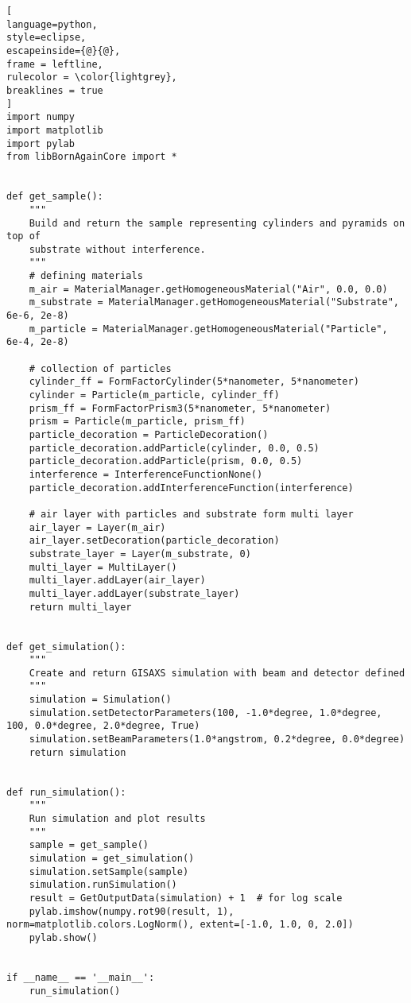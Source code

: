 \begin{lstlisting}[
language=python, 
style=eclipse, 
escapeinside={@}{@},
frame = leftline, 
rulecolor = \color{lightgrey},
breaklines = true
]
import numpy
import matplotlib
import pylab
from libBornAgainCore import *


def get_sample():
    """
    Build and return the sample representing cylinders and pyramids on top of
    substrate without interference.
    """
    # defining materials
    m_air = MaterialManager.getHomogeneousMaterial("Air", 0.0, 0.0)
    m_substrate = MaterialManager.getHomogeneousMaterial("Substrate", 6e-6, 2e-8)
    m_particle = MaterialManager.getHomogeneousMaterial("Particle", 6e-4, 2e-8)

    # collection of particles
    cylinder_ff = FormFactorCylinder(5*nanometer, 5*nanometer)
    cylinder = Particle(m_particle, cylinder_ff)
    prism_ff = FormFactorPrism3(5*nanometer, 5*nanometer)
    prism = Particle(m_particle, prism_ff)
    particle_decoration = ParticleDecoration()
    particle_decoration.addParticle(cylinder, 0.0, 0.5)
    particle_decoration.addParticle(prism, 0.0, 0.5)
    interference = InterferenceFunctionNone()
    particle_decoration.addInterferenceFunction(interference)

    # air layer with particles and substrate form multi layer
    air_layer = Layer(m_air)
    air_layer.setDecoration(particle_decoration)
    substrate_layer = Layer(m_substrate, 0)
    multi_layer = MultiLayer()
    multi_layer.addLayer(air_layer)
    multi_layer.addLayer(substrate_layer)
    return multi_layer


def get_simulation():
    """
    Create and return GISAXS simulation with beam and detector defined
    """
    simulation = Simulation()
    simulation.setDetectorParameters(100, -1.0*degree, 1.0*degree, 100, 0.0*degree, 2.0*degree, True)
    simulation.setBeamParameters(1.0*angstrom, 0.2*degree, 0.0*degree)
    return simulation


def run_simulation():
    """
    Run simulation and plot results
    """
    sample = get_sample()
    simulation = get_simulation()
    simulation.setSample(sample)
    simulation.runSimulation()
    result = GetOutputData(simulation) + 1  # for log scale
    pylab.imshow(numpy.rot90(result, 1), norm=matplotlib.colors.LogNorm(), extent=[-1.0, 1.0, 0, 2.0])
    pylab.show()


if __name__ == '__main__':
    run_simulation()

\end{lstlisting}



